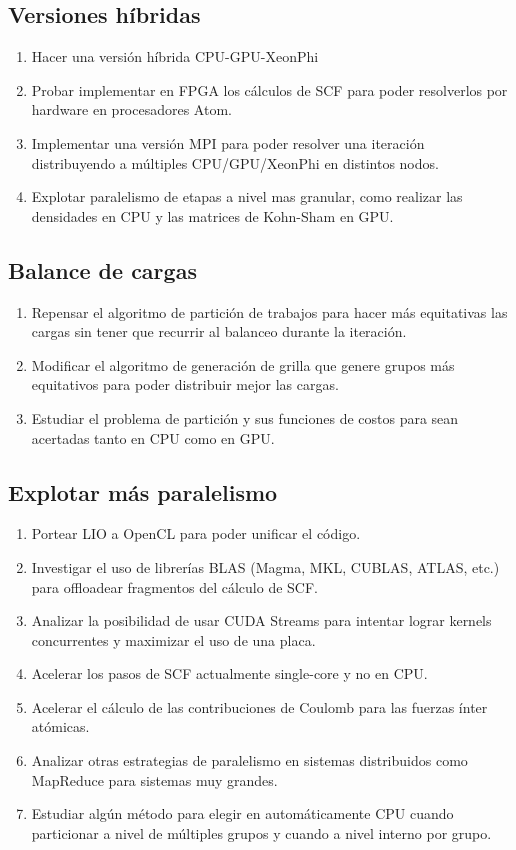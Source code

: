\subsection{Versiones h\'ibridas}
\begin{enumerate}
 \item Hacer una versi\'on h\'ibrida CPU-GPU-XeonPhi
  \item Probar implementar en FPGA los c\'alculos de SCF para poder resolverlos por hardware en procesadores
    Atom.
  \item Implementar una versi\'on MPI para poder resolver una iteraci\'on distribuyendo
    a m\'ultiples CPU/GPU/XeonPhi en distintos nodos.
  \item Explotar paralelismo de etapas a nivel mas granular, como realizar las densidades en CPU y las matrices
    de Kohn-Sham en GPU.
\end{enumerate}

\subsection{Balance de cargas}
\begin{enumerate}
  \item Repensar el algoritmo de partici\'on de trabajos para hacer m\'as equitativas las cargas sin
    tener que recurrir al balanceo durante la iteraci\'on.
  \item Modificar el algoritmo de generaci\'on de grilla que genere grupos m\'as equitativos para poder
    distribuir mejor las cargas.
  \item Estudiar el problema de partici\'on y sus funciones de costos para sean acertadas tanto en CPU
    como en GPU.
\end{enumerate}

\subsection{Explotar m\'as paralelismo}
\begin{enumerate}
  \item Portear LIO a OpenCL para poder unificar el c\'odigo.
  \item Investigar el uso de librer\'ias BLAS (Magma, MKL, CUBLAS, ATLAS, etc.) para offloadear fragmentos del
    c\'alculo de SCF.
  \item Analizar la posibilidad de usar CUDA Streams para intentar lograr kernels concurrentes y maximizar
    el uso de una placa.
  \item Acelerar los pasos de SCF actualmente single-core y no en CPU.
  \item Acelerar el c\'alculo de las contribuciones de Coulomb para las fuerzas \'inter at\'omicas.
  \item Analizar otras estrategias de paralelismo en sistemas distribuidos como MapReduce para sistemas muy grandes.
  \item Estudiar alg\'un m\'etodo para elegir en autom\'aticamente CPU cuando particionar a nivel
    de m\'ultiples grupos y cuando a nivel interno por grupo.
\end{enumerate}

